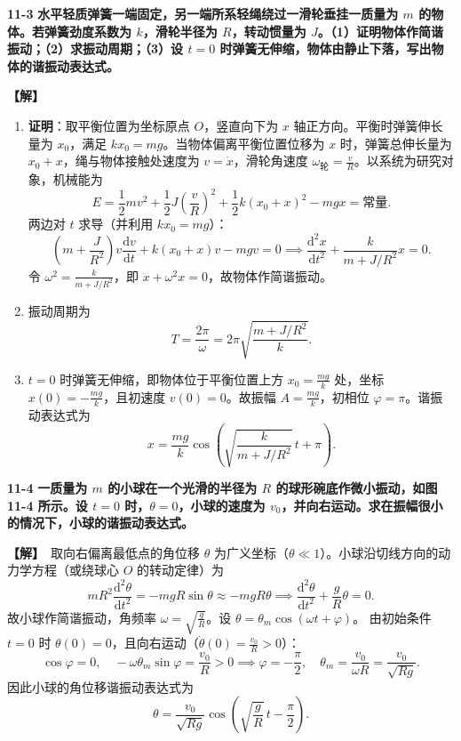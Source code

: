 \documentclass[zihao=5,a4paper,UTF8]{ctexart}
\newenvironment{prob}[2]{%
    \par\vspace{6pt}\noindent\textbf{\color{navy}#1} \textbf{#2}\par\nopagebreak\vspace{2pt}%
}{%
    \par\vspace{4pt}%
}
\newcommand{\sol}{\noindent\textbf{\color{tealaccent}【解】}\ }
\newcommand{\dd}{\mathrm{d}}
\begin{document}
\begin{prob}{11-3}{水平轻质弹簧一端固定，另一端所系轻绳绕过一滑轮垂挂一质量为 $m$ 的物体。若弹簧劲度系数为 $k$，滑轮半径为 $R$，转动惯量为 $J$。（1）证明物体作简谐振动；（2）求振动周期；（3）设 $t=0$ 时弹簧无伸缩，物体由静止下落，写出物体的谐振动表达式。}
\sol
\begin{enumerate}[leftmargin=2em, itemsep=2pt]
    \item \textbf{证明}：取平衡位置为坐标原点 $O$，竖直向下为 $x$ 轴正方向。平衡时弹簧伸长量为 $x_0$，满足 $kx_0 = mg$。当物体偏离平衡位置位移为 $x$ 时，弹簧总伸长量为 $x_0 + x$，绳与物体接触处速度为 $v = \dot{x}$，滑轮角速度 $\omega_{\text{轮}} = \frac{v}{R}$。以系统为研究对象，机械能为
    \[
        E = \frac{1}{2}mv^2 + \frac{1}{2}J\left(\frac{v}{R}\right)^2 + \frac{1}{2}k(x_0+x)^2 - mgx = \text{常量}.
    \]
    两边对 $t$ 求导（并利用 $kx_0 = mg$）：
    \[
        \left(m + \frac{J}{R^2}\right)v\frac{\dd v}{\dd t} + k(x_0+x)v - mgv = 0 \implies \frac{\dd^2 x}{\dd t^2} + \frac{k}{m + J/R^2}x = 0.
    \]
    令 $\omega^2 = \frac{k}{m + J/R^2}$，即 $\ddot{x} + \omega^2 x = 0$，故物体作简谐振动。
    \item 振动周期为
    \[
        T = \frac{2\pi}{\omega} = 2\pi\sqrt{\frac{m + J/R^2}{k}}.
    \]
    \item $t=0$ 时弹簧无伸缩，即物体位于平衡位置上方 $x_0 = \frac{mg}{k}$ 处，坐标 $x(0) = -\frac{mg}{k}$，且初速度 $v(0) = 0$。故振幅 $A = \frac{mg}{k}$，初相位 $\varphi = \pi$。谐振动表达式为
    \[
        x = \frac{mg}{k}\cos\left(\sqrt{\frac{k}{m + J/R^2}}\,t + \pi\right).
    \]
\end{enumerate}
\end{prob}

\begin{prob}{11-4}{一质量为 $m$ 的小球在一个光滑的半径为 $R$ 的球形碗底作微小振动，如图 11-4 所示。设 $t=0$ 时，$\theta=0$，小球的速度为 $v_0$，并向右运动。求在振幅很小的情况下，小球的谐振动表达式。}
\sol 取向右偏离最低点的角位移 $\theta$ 为广义坐标（$\theta \ll 1$）。小球沿切线方向的动力学方程（或绕球心 $O$ 的转动定律）为
\[
    mR^2\frac{\dd^2\theta}{\dd t^2} = -mgR\sin\theta \approx -mgR\theta \implies \frac{\dd^2\theta}{\dd t^2} + \frac{g}{R}\theta = 0.
\]
故小球作简谐振动，角频率 $\omega = \sqrt{\frac{g}{R}}$。设 $\theta = \theta_m\cos(\omega t + \varphi)$。
由初始条件 $t=0$ 时 $\theta(0) = 0$，且向右运动（$\dot{\theta}(0) = \frac{v_0}{R} > 0$）：
\[
    \cos\varphi = 0,\quad -\omega\theta_m\sin\varphi = \frac{v_0}{R} > 0 \implies \varphi = -\frac{\pi}{2},\quad \theta_m = \frac{v_0}{\omega R} = \frac{v_0}{\sqrt{Rg}}.
\]
因此小球的角位移谐振动表达式为
\[
    \theta = \frac{v_0}{\sqrt{Rg}}\cos\left(\sqrt{\frac{g}{R}}\,t - \frac{\pi}{2}\right).
\]
\end{prob}
\end{document}
